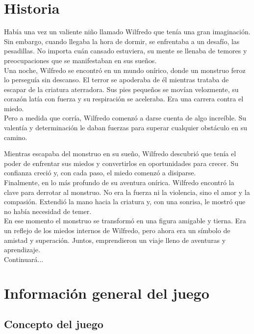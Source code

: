 \section{Historia}

Había una vez un valiente niño llamado Wilfredo que tenía una gran
imaginación. Sin embargo, cuando llegaba la hora de dormir, se
enfrentaba a un desafío, las pesadillas. No importa cuán cansado
estuviera, su mente se llenaba de temores y preocupaciones que se
manifestaban en sus sueños.\\

Una noche, Wilfredo se encontró en un mundo onírico, donde un monstruo
feroz lo perseguía sin descanso. El terror se apoderaba de él mientras
trataba de escapar de la criatura aterradora. Sus pies pequeños se movían
velozmente, su corazón latía con fuerza y su respiración se aceleraba. Era
una carrera contra el miedo.\\

Pero a medida que corría, Wilfredo comenzó a darse cuenta de algo increíble.
Su valentía y determinación le daban fuerzas para superar cualquier obstáculo
en su camino.

Mientras escapaba del monstruo en su sueño, Wilfredo descubrió que tenía el
poder de enfrentar sus miedos y convertirlos en oportunidades para crecer.
Su confianza creció y, con cada paso, el miedo comenzó a disiparse.\\

Finalmente, en lo más profundo de su aventura onírica. Wilfredo encontró la clave
para derrotar al monstruo. No era la fuerza ni la violencia, sino el amor y la
compasión. Extendió la mano hacia la criatura y, con una sonrisa, le mostró que no
había necesidad de temer.\\

En ese momento el monstruo se transformó en una figura amigable y tierna. Era un
reflejo de los miedos internos de Wilfredo, pero ahora era un símbolo de
amistad y superación. Juntos, emprendieron un viaje lleno de aventuras y aprendizaje.\\


Continuará...

\section{Información general del juego}

\subsection{Concepto del juego}

